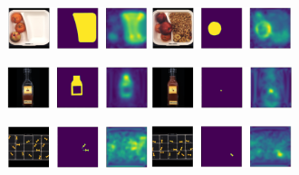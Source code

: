 \begin{figure}[H]
    \captionsetup[subfigure]{justification=centering}
    \centering
    \begin{subfigure}[b]{\textwidth}
        \centering
        \includegraphics[width=0.45\textwidth]{figures/appendix/appendix_patchcore/BB/breakfast_box_test_logical_anomalies_034.png}
        \includegraphics[width=0.45\textwidth]{figures/appendix/appendix_patchcore/BB/breakfast_box_test_structural_anomalies_024.png}

    \end{subfigure}
    \begin{subfigure}[b]{\textwidth}
        \centering
        \includegraphics[width=0.45\textwidth]{figures/appendix/appendix_patchcore/JB/juice_bottle_test_logical_anomalies_090.png}
        \includegraphics[width=0.45\textwidth]{figures/appendix/appendix_patchcore/JB/juice_bottle_test_structural_anomalies_037.png}

    \end{subfigure}
    \begin{subfigure}[b]{\textwidth}
        \centering
        \includegraphics[width=0.45\textwidth]{figures/appendix/appendix_patchcore/PP/pushpins_test_logical_anomalies_025.png}
        \includegraphics[width=0.45\textwidth]{figures/appendix/appendix_patchcore/PP/pushpins_test_structural_anomalies_064.png}


\end{subfigure}
\end{figure}
